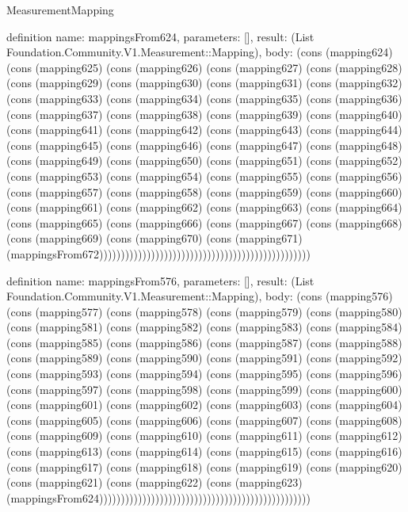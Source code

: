 \begin{lexlean}{MeasurementMapping}
\begin{semanticmodule}
definition{
  name: mappingsFrom624,
  parameters: [],
  result: (List Foundation.Community.V1.Measurement::Mapping),
  body: (cons (mapping624) (cons (mapping625) (cons (mapping626) (cons (mapping627) (cons (mapping628) (cons (mapping629) (cons (mapping630) (cons (mapping631) (cons (mapping632) (cons (mapping633) (cons (mapping634) (cons (mapping635) (cons (mapping636) (cons (mapping637) (cons (mapping638) (cons (mapping639) (cons (mapping640) (cons (mapping641) (cons (mapping642) (cons (mapping643) (cons (mapping644) (cons (mapping645) (cons (mapping646) (cons (mapping647) (cons (mapping648) (cons (mapping649) (cons (mapping650) (cons (mapping651) (cons (mapping652) (cons (mapping653) (cons (mapping654) (cons (mapping655) (cons (mapping656) (cons (mapping657) (cons (mapping658) (cons (mapping659) (cons (mapping660) (cons (mapping661) (cons (mapping662) (cons (mapping663) (cons (mapping664) (cons (mapping665) (cons (mapping666) (cons (mapping667) (cons (mapping668) (cons (mapping669) (cons (mapping670) (cons (mapping671) (mappingsFrom672)))))))))))))))))))))))))))))))))))))))))))))))))
}

definition{
  name: mappingsFrom576,
  parameters: [],
  result: (List Foundation.Community.V1.Measurement::Mapping),
  body: (cons (mapping576) (cons (mapping577) (cons (mapping578) (cons (mapping579) (cons (mapping580) (cons (mapping581) (cons (mapping582) (cons (mapping583) (cons (mapping584) (cons (mapping585) (cons (mapping586) (cons (mapping587) (cons (mapping588) (cons (mapping589) (cons (mapping590) (cons (mapping591) (cons (mapping592) (cons (mapping593) (cons (mapping594) (cons (mapping595) (cons (mapping596) (cons (mapping597) (cons (mapping598) (cons (mapping599) (cons (mapping600) (cons (mapping601) (cons (mapping602) (cons (mapping603) (cons (mapping604) (cons (mapping605) (cons (mapping606) (cons (mapping607) (cons (mapping608) (cons (mapping609) (cons (mapping610) (cons (mapping611) (cons (mapping612) (cons (mapping613) (cons (mapping614) (cons (mapping615) (cons (mapping616) (cons (mapping617) (cons (mapping618) (cons (mapping619) (cons (mapping620) (cons (mapping621) (cons (mapping622) (cons (mapping623) (mappingsFrom624)))))))))))))))))))))))))))))))))))))))))))))))))
}


\end{semanticmodule}
\end{lexlean}
